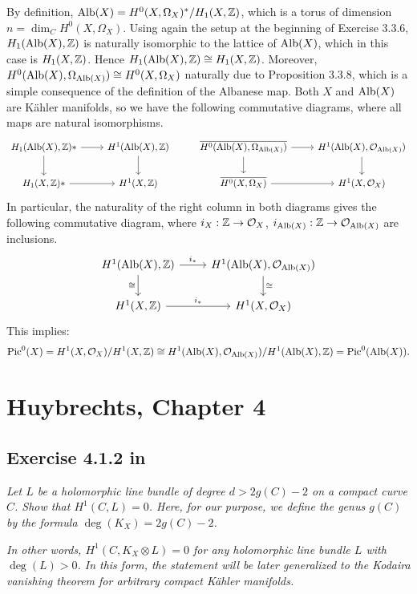 \documentclass{article}
\begin{document}
By definition, $\operatorname{Alb}(X) = H^0(X,\Omega_X)^* / H_1(X,\mathbb{Z})$, which is a torus of dimension $n = \dim_C H^0(X,\Omega_X)$.
Using again the setup at the beginning of Exercise 3.3.6, $H_1(\operatorname{Alb}(X),\mathbb{Z})$ is naturally isomorphic to the lattice
of $\operatorname{Alb}(X)$, which in this case is $H_1(X,\mathbb{Z})$. Hence $H_1(\operatorname{Alb}(X),\mathbb{Z}) \cong H_1(X,\mathbb{Z})$. Moreover,
$H^0(\operatorname{Alb}(X), \Omega_{\operatorname{Alb}(X)}) \cong H^0(X,\Omega_X)$ naturally due to Proposition 3.3.8, which is a simple consequence
of the definition of the Albanese map. Both $X$ and $\operatorname{Alb}(X)$ are K\"{a}hler manifolds, so we have the following
commutative diagrams, where all maps are natural isomorphisms.
\[
\begin{tikzcd}
H_1(\Alb(X),\Z)*\arrow{r}\arrow{d} & H^1(\Alb(X),\Z)\arrow{d} & 
\overline{H^0(\Alb(X), \Omega_{\Alb(X)})}\arrow{r}\arrow{d} & H^1(\Alb(X), \mathcal{O}_{\Alb(X)})\arrow{d} \\
H_1(X,\Z)*\arrow{r} & H^1(X,\Z) &
\overline{H^0(X, \Omega_{X})}\arrow{r} & H^1(X, \mathcal{O}_{X})
\end{tikzcd}
\]
In particular, the naturality of the right column in both diagrams gives the following commutative diagram,
where $i_X:\mathbb{Z} \to \mathcal{O}_X$, $i_{\operatorname{Alb}(X)} : \mathbb{Z} \to \mathcal{O}_{\operatorname{Alb}(X)}$ are inclusions.
\[
\begin{tikzcd}
H^1(\Alb(X),\Z) \arrow{r}{i_*}\arrow[swap]{d}{\cong} & H^1(\Alb(X), \mathcal{O}_{\Alb(X)})\arrow{d}{\cong} \\
H^1(X,\Z) \arrow{r}{i_*} & H^1(X, \mathcal{O}_{X})
\end{tikzcd}
\]
This implies:
\[	\operatorname{Pic}^0(X) = H^1(X, \mathcal{O}_{X}) /H^1(X,\mathbb{Z}) \cong H^1(\operatorname{Alb}(X), \mathcal{O}_{\operatorname{Alb}(X)}) / H^1(\operatorname{Alb}(X),\mathbb{Z}) 
= \operatorname{Pic}^0(\operatorname{Alb}(X)). 	\]



\section{Huybrechts, Chapter 4}

\subsection*{Exercise 4.1.2 in \cite{Huy}}
\emph{Let $L$ be a holomorphic line bundle of degree $d>2g(C)-2$ on a compact curve $C$. Show that $H^1(C,L) = 0$.
Here, for our purpose, we define the genus $g(C)$ by the formula $\deg(K_X) = 2g(C) - 2$.}

\emph{In other words, $H^1(C,K_X\otimes L) = 0$ for any holomorphic line bundle $L$ with $\deg(L)>0$. In this form,
the statement will be later generalized to the Kodaira vanishing theorem for arbitrary compact K\"{a}hler manifolds.}
\vspace{3mm}
\end{document}
